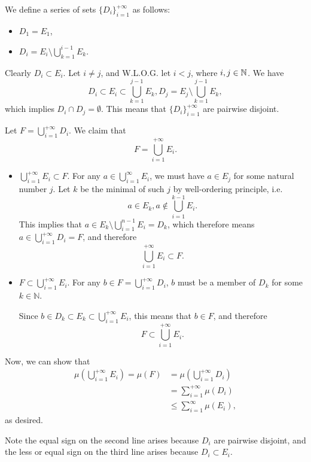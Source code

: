 We define a series of sets \(\{D_i\}_{i = 1}^{+\infty}\) as follows:
\begin{itemize}
    \item \(D_1 = E_1\),
    \item \(D_i = E_i \setminus \bigcup_{k = 1}^{i - 1} E_k\).
\end{itemize}

Clearly \(D_i \subset E_i\). Let \(i \neq j\), and W.L.O.G. let \(i < j\), where \(i, j \in \mathbb{N}\). We have
\[
D_i \subset E_i \subset \bigcup_{k = 1}^{j - 1}E_k, D_j = E_j \setminus \bigcup_{k = 1}^{j - 1}E_k,
\]
which implies \(D_i \cap D_j = \emptyset\). This means that \(\{D_i\}_{i = 1}^{+\infty}\) are pairwise disjoint.

Let \(F = \bigcup_{i = 1}^{+\infty}D_i\). We claim that
\[
F = \bigcup_{i = 1}^{+\infty}E_i.
\]

\begin{itemize}
    \item \(\bigcup_{i = 1}^{+\infty}E_i \subset F\). For any \(a \in \bigcup_{i = 1}^{\infty} E_i\), we must have \(a \in E_j\) for some natural number \(j\). Let \(k\) be the minimal of such \(j\) by well-ordering principle, i.e.
    \[
    a \in E_k, a \notin \bigcup_{i = 1}^{k - 1} E_i.
    \]
    This implies that \(a \in E_k \setminus \bigcup_{i = 1}^{n - 1} E_i = D_k\), which therefore means \(a \in \bigcup_{i = 1}^{+\infty}D_i = F\), and therefore
    \[\bigcup_{i = 1}^{+\infty}E_i \subset F.\]

    \item \(F \subset \bigcup_{i = 1}^{+\infty}E_i\). For any \(b \in F = \bigcup_{i = 1}^{+\infty} D_i\), \(b\) must be a member of \(D_k\) for some \(k \in \mathbb{N}\).

    Since \(b \in D_k \subset E_k \subset \bigcup_{i = 1}^{+\infty}E_i\), this means that \(b \in F\), and therefore
    \[F \subset \bigcup_{i = 1}^{+\infty}E_i.\]
\end{itemize}

Now, we can show that
\begin{align*}
    \mu\left(\bigcup_{i = 1}^{+\infty} E_i\right) = \mu(F) &= \mu\left(\bigcup_{i = 1}^{+\infty} D_i\right)\\
    &= \sum_{i = 1}^{+\infty} \mu(D_i)\\
    &\leq \sum_{i = 1}^{\infty} \mu(E_i),
\end{align*}
as desired.

Note the equal sign on the second line arises because \(D_i\) are pairwise disjoint, and the less or equal sign on the third line arises because \(D_i \subset E_i\).